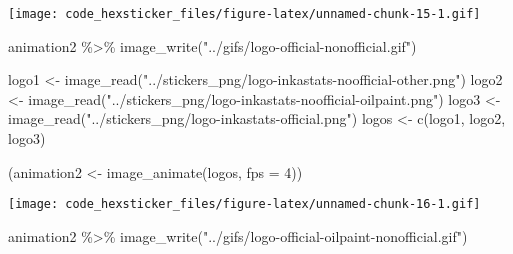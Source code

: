 \documentclass[
]{article}
\newenvironment{Shaded}{\begin{snugshade}}{\end{snugshade}}
\newcommand{\AttributeTok}[1]{\textcolor[rgb]{0.77,0.63,0.00}{#1}}
\newcommand{\DecValTok}[1]{\textcolor[rgb]{0.00,0.00,0.81}{#1}}
\newcommand{\FunctionTok}[1]{\textcolor[rgb]{0.00,0.00,0.00}{#1}}
\newcommand{\NormalTok}[1]{#1}
\newcommand{\OtherTok}[1]{\textcolor[rgb]{0.56,0.35,0.01}{#1}}
\newcommand{\SpecialCharTok}[1]{\textcolor[rgb]{0.00,0.00,0.00}{#1}}
\newcommand{\StringTok}[1]{\textcolor[rgb]{0.31,0.60,0.02}{#1}}
\begin{document}
\texttt{[image: code\_hexsticker\_files/figure-latex/unnamed-chunk-15-1.gif]}

\begin{Shaded}
\begin{Highlighting}[]
\NormalTok{animation2 }\SpecialCharTok{\%\textgreater{}\%} 
  \FunctionTok{image\_write}\NormalTok{(}\StringTok{"../gifs/logo{-}official{-}nonofficial.gif"}\NormalTok{)}
\end{Highlighting}
\end{Shaded}

\begin{Shaded}
\begin{Highlighting}[]
\NormalTok{logo1 }\OtherTok{\textless{}{-}} \FunctionTok{image\_read}\NormalTok{(}\StringTok{"../stickers\_png/logo{-}inkastats{-}noofficial{-}other.png"}\NormalTok{)}
\NormalTok{logo2 }\OtherTok{\textless{}{-}} \FunctionTok{image\_read}\NormalTok{(}\StringTok{"../stickers\_png/logo{-}inkastats{-}noofficial{-}oilpaint.png"}\NormalTok{)}
\NormalTok{logo3 }\OtherTok{\textless{}{-}} \FunctionTok{image\_read}\NormalTok{(}\StringTok{"../stickers\_png/logo{-}inkastats{-}official.png"}\NormalTok{)}
\NormalTok{logos }\OtherTok{\textless{}{-}} \FunctionTok{c}\NormalTok{(logo1, logo2, logo3)}

\NormalTok{(animation2 }\OtherTok{\textless{}{-}} \FunctionTok{image\_animate}\NormalTok{(logos, }\AttributeTok{fps =} \DecValTok{4}\NormalTok{)) }
\end{Highlighting}
\end{Shaded}

\texttt{[image: code\_hexsticker\_files/figure-latex/unnamed-chunk-16-1.gif]}

\begin{Shaded}
\begin{Highlighting}[]
\NormalTok{animation2 }\SpecialCharTok{\%\textgreater{}\%} 
  \FunctionTok{image\_write}\NormalTok{(}\StringTok{"../gifs/logo{-}official{-}oilpaint{-}nonofficial.gif"}\NormalTok{)}
\end{Highlighting}
\end{Shaded}
\end{document}

